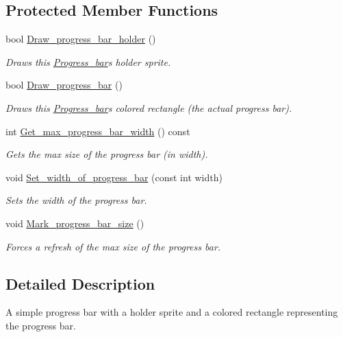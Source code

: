 \subsection*{Protected Member Functions}
\begin{DoxyCompactItemize}
\item 
bool \hyperlink{classjetfuel_1_1gui_1_1Progress__bar_a97bc9fab7b77a271db47f91c95af8672}{Draw\+\_\+progress\+\_\+bar\+\_\+holder} ()
\begin{DoxyCompactList}\small\item\em Draws this \hyperlink{classjetfuel_1_1gui_1_1Progress__bar}{Progress\+\_\+bar}\textquotesingle{}s holder sprite. \end{DoxyCompactList}\item 
bool \hyperlink{classjetfuel_1_1gui_1_1Progress__bar_ad27c8ac735ad8698fce255b642cc6944}{Draw\+\_\+progress\+\_\+bar} ()
\begin{DoxyCompactList}\small\item\em Draws this \hyperlink{classjetfuel_1_1gui_1_1Progress__bar}{Progress\+\_\+bar}\textquotesingle{}s colored rectangle (the actual progress bar). \end{DoxyCompactList}\item 
int \hyperlink{classjetfuel_1_1gui_1_1Progress__bar_ac8399712a5a25311f8f618ed33f730dc}{Get\+\_\+max\+\_\+progress\+\_\+bar\+\_\+width} () const
\begin{DoxyCompactList}\small\item\em Gets the max size of the progress bar (in width). \end{DoxyCompactList}\item 
void \hyperlink{classjetfuel_1_1gui_1_1Progress__bar_a5975a20358c54bc05d87d4285cefe990}{Set\+\_\+width\+\_\+of\+\_\+progress\+\_\+bar} (const int width)
\begin{DoxyCompactList}\small\item\em Sets the width of the progress bar. \end{DoxyCompactList}\item 
void \hyperlink{classjetfuel_1_1gui_1_1Progress__bar_a4871a444df390b3a4996ce8bb67f90c8}{Mark\+\_\+progress\+\_\+bar\+\_\+size} ()
\begin{DoxyCompactList}\small\item\em Forces a refresh of the max size of the progress bar. \end{DoxyCompactList}\end{DoxyCompactItemize}


\subsection{Detailed Description}
A simple progress bar with a holder sprite and a colored rectangle representing the progress bar.

